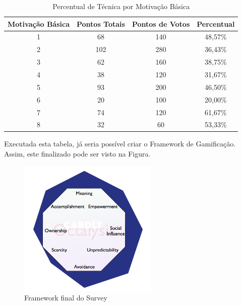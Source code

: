 \begin{table}[]
\centering
\caption{Percentual de Técnica por Motivação Básica}
\label{tab:percentual_tecnica_motivacao}
\begin{tabular}{@{}cccc@{}}
\toprule
Motivação Básica & Pontos Totais & Pontos de Votos & Percentual \\ \midrule
1         & 68            & 140             & 48,57\%    \\
2         & 102           & 280             & 36,43\%    \\
3         & 62            & 160             & 38,75\%    \\
4         & 38            & 120             & 31,67\%    \\
5         & 93            & 200             & 46,50\%    \\
6         & 20            & 100             & 20,00\%    \\
7         & 74            & 120             & 61,67\%    \\
8         & 32            & 60              & 53,33\%    \\ \bottomrule
\end{tabular}
\end{table}

Executada esta tabela, já seria possível criar o Framework de Gamificação. Assim,
este finalizado pode ser visto na Figura.

\begin{figure}[h]
    \centering

    \includegraphics[width=250px, scale=1]{figuras/final_survey}
    \caption{Framework final do Survey}

    \label{fig:final_framework_octalisys}
\end{figure}

